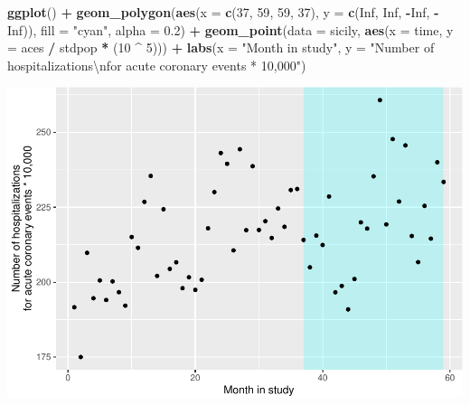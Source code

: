 \documentclass[
]{book}
\newenvironment{Shaded}{\begin{snugshade}}{\end{snugshade}}
\newcommand{\CharTok}[1]{\textcolor[rgb]{0.31,0.60,0.02}{#1}}
\newcommand{\DataTypeTok}[1]{\textcolor[rgb]{0.13,0.29,0.53}{#1}}
\newcommand{\DecValTok}[1]{\textcolor[rgb]{0.00,0.00,0.81}{#1}}
\newcommand{\FloatTok}[1]{\textcolor[rgb]{0.00,0.00,0.81}{#1}}
\newcommand{\KeywordTok}[1]{\textcolor[rgb]{0.13,0.29,0.53}{\textbf{#1}}}
\newcommand{\NormalTok}[1]{#1}
\newcommand{\OperatorTok}[1]{\textcolor[rgb]{0.81,0.36,0.00}{\textbf{#1}}}
\newcommand{\OtherTok}[1]{\textcolor[rgb]{0.56,0.35,0.01}{#1}}
\newcommand{\StringTok}[1]{\textcolor[rgb]{0.31,0.60,0.02}{#1}}
\begin{document}
\begin{Shaded}
\begin{Highlighting}[]
\KeywordTok{ggplot}\NormalTok{() }\OperatorTok{+}\StringTok{ }
\StringTok{  }\KeywordTok{geom_polygon}\NormalTok{(}\KeywordTok{aes}\NormalTok{(}\DataTypeTok{x =} \KeywordTok{c}\NormalTok{(}\DecValTok{37}\NormalTok{, }\DecValTok{59}\NormalTok{, }\DecValTok{59}\NormalTok{, }\DecValTok{37}\NormalTok{), }
                   \DataTypeTok{y =} \KeywordTok{c}\NormalTok{(}\OtherTok{Inf}\NormalTok{, }\OtherTok{Inf}\NormalTok{, }\OperatorTok{-}\OtherTok{Inf}\NormalTok{, }\OperatorTok{-}\OtherTok{Inf}\NormalTok{)), }
               \DataTypeTok{fill =} \StringTok{"cyan"}\NormalTok{, }\DataTypeTok{alpha =} \FloatTok{0.2}\NormalTok{) }\OperatorTok{+}\StringTok{ }
\StringTok{  }\KeywordTok{geom_point}\NormalTok{(}\DataTypeTok{data =}\NormalTok{ sicily, }\KeywordTok{aes}\NormalTok{(}\DataTypeTok{x =}\NormalTok{ time, }\DataTypeTok{y =}\NormalTok{ aces }\OperatorTok{/}\StringTok{ }\NormalTok{stdpop }\OperatorTok{*}\StringTok{ }\NormalTok{(}\DecValTok{10} \OperatorTok{^}\StringTok{ }\DecValTok{5}\NormalTok{))) }\OperatorTok{+}\StringTok{ }
\StringTok{  }\KeywordTok{labs}\NormalTok{(}\DataTypeTok{x =} \StringTok{"Month in study"}\NormalTok{, }
       \DataTypeTok{y =} \StringTok{"Number of hospitalizations}\CharTok{\textbackslash{}n}\StringTok{for acute coronary events * 10,000"}\NormalTok{)}
\end{Highlighting}
\end{Shaded}

\includegraphics{adv_epi_analysis_files/figure-latex/unnamed-chunk-125-1.pdf}
\end{document}
